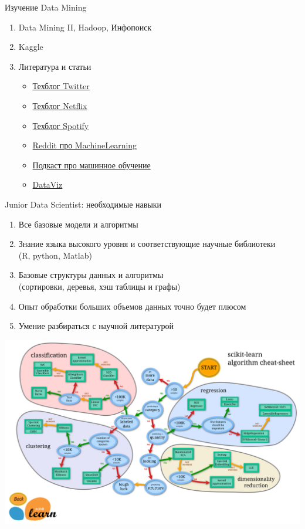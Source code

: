 \documentclass[aspectratio=169]{beamer}
\begin{document}
\begin{frame}{Изучение Data Mining}

\begin{enumerate}
\item Data Mining II, Hadoop, Инфопоиск
\item Kaggle
\item Литература и статьи
\begin{itemize}
\item\href{https://blog.twitter.com/engineering}{Техблог Twitter}
\item\href{http://techblog.netflix.com/?m=1}{Техблог Netflix}
\item\href{https://labs.spotify.com/}{Техблог Spotify}
\item\href{http://www.reddit.com/r/MachineLearning/}{Reddit про MachineLearning}
\item\href{http://www.thetalkingmachines.com/}{Подкаст про машинное обучение}
\item\href{http://flowingdata.com/}{DataViz}
\end{itemize}
\end{enumerate}

\end{frame}

\begin{frame}{Junior Data Scientist: необходимые навыки}

\begin{enumerate}
\item Все базовые модели и алгоритмы
\item Знание языка высокого уровня и соответствующие научные библиотеки \\ (R, python, Matlab)
\item Базовые структуры данных и алгоритмы \\ (сортировки, деревья, хэш таблицы и графы)
\item Опыт обработки больших объемов данных точно будет плюсом
\item Умение разбираться с научной литературой
\end{enumerate}

\end{frame}

\begin{frame}{}
\begin{center}
\includegraphics[scale=0.08]{images/sklearn.png}
\end{center}
\end{frame}
\end{document}
